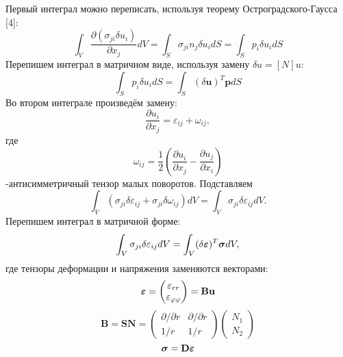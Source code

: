 \documentclass[a4paper,14pt]{extarticle}
\begin{document}
Первый интеграл можно переписать, используя теорему Остроградского-Гаусса [4]: 
\begin{equation*}
\int_{V} \frac{\partial (\sigma_{ji} \delta u_{i})}{\partial x_{j}}dV=\int_{ S} \sigma_{ji} n_{j} \delta u_{i} dS=\int_{ S} p_{i} \delta u_{i} dS
\end{equation*}
Перепишем интеграл в матричном виде, используя замену $\delta u=[N] u$:
\begin{equation}\label{Int1}
\int_{S} p_i \delta u_i dS=\int_{S} (\delta \mathbf{u})^T \mathbf{p} dS
\end{equation}
Во втором интеграле произведём замену:
\begin{equation*}
\frac{\partial u_{i}}{\partial x_{j}}=\varepsilon_{ij}+\omega_{ij},
\end{equation*}
где 
\begin{equation*}
\omega_{ij}=\frac{1}{2}(\frac{\partial u_{i}}{\partial x_{j}}-\frac{\partial u_{j}}{\partial x_{i}})
\end{equation*}
-антисимметричный тензор малых поворотов. Подставляем
\begin{equation*}
\int_{V} (\sigma_{ji}\delta\varepsilon_{ij}+\sigma_{ji}\delta\omega_{ij})dV=\int_{V} \sigma_{ji} \delta \varepsilon_{ij}dV.
\end{equation*}
Перепишем интеграл в матричной форме:
\begin{equation}\label{Int2}
\int_{V} \sigma_{ji} \delta \varepsilon_{ij}dV=\int_{V} (\delta\mathbf{\mbox{\boldmath$\varepsilon$}})^{T}\mathbf{\mbox{\boldmath$\sigma$}}dV,
\end{equation}
где тензоры деформации и напряжения заменяются векторами:
\begin{equation*}
\mbox{\boldmath$\varepsilon$}=
\begin{pmatrix}
\varepsilon_{rr} \\
\varepsilon_{\varphi \varphi}
\end{pmatrix}
=\mathbf{B}\mathbf{u}
\end{equation*}
\begin{equation*}
\mathbf{B}=\mathbf{S}\mathbf{N}=
\begin{pmatrix}
\partial / \partial r & \partial / \partial r \\
1/r & 1/r
\end{pmatrix}
\begin{pmatrix}
N_1 \\
N_2
\end{pmatrix}
\end{equation*}
\begin{equation*}
\mbox{\boldmath$\sigma$}=\mathbf{D}\mbox{\boldmath$\varepsilon$}
\end{equation*}
\end{document}
